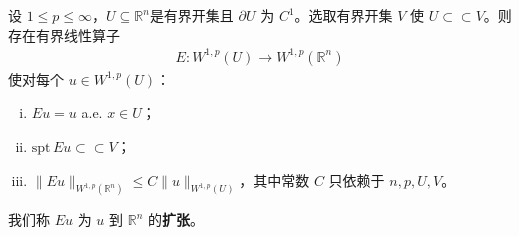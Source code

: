 \documentclass[../../main.tex]{subfiles}
\begin{document}
\begin{theorem}[扩张定理]\label{theorem:ch05-扩张定理}
设 $1\leqslant p\leqslant\infty$，$U\subseteq \mathbb{R}^n$是有界开集且 $\partial U$ 为 $C^{1}$。选取有界开集 $V$ 使 $U\subset \subset V$。则存在有界线性算子
\begin{align}
E:W^{1,p}(U)\to W^{1,p}(\mathbb{R}^{n})
\end{align}
使对每个 $u\in W^{1,p}(U)$：
\begin{enumerate}[(i)]
\item $Eu=u$ a.e. $x\in U$；
\item $\text{spt}\,Eu\subset \subset V$；
\item $\|Eu\|_{W^{1,p}(\mathbb{R}^{n})}\leqslant C\|u\|_{W^{1,p}(U)}$，其中常数 $C$ 只依赖于 $n,p,U,V$。
\end{enumerate}
我们称 $Eu$ 为 $u$ 到 $\mathbb{R}^{n}$ 的\textbf{扩张}。
\end{theorem}
\end{document}
